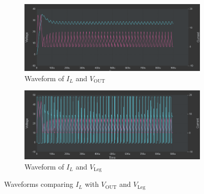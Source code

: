 \begin{figure}[h!]
    \centering
    \begin{subfigure}[b]{0.45\linewidth}
        \centering
        \includegraphics[width=\linewidth]{img/hfd2/IL-VOUT-7.png}
        \caption{Waveform of \(I_{L}\) and \(V_{\text{OUT}}\)}
        \label{fig:Waveform_IL_VOUT}
    \end{subfigure}%
    \hfill
    \begin{subfigure}[b]{0.45\linewidth}
        \centering
        \includegraphics[width=\linewidth]{img/hfd2/IL-VLeg-7.png}
        \caption{Waveform of \(I_{L}\) and \(V_{\text{Leg}}\)}
        \label{fig:Waveform_IL_VLeg2}
    \end{subfigure}
    
    \caption{Waveforms comparing \(I_{L}\) with \(V_{\text{OUT}}\) and \(V_{\text{Leg}}\)}
    \label{fig:Waveforms_IL_VOUT_VLeg}
\end{figure}

